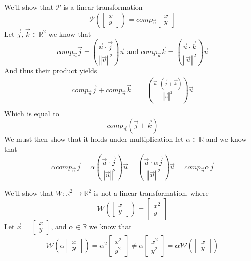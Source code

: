 \documentclass[notoc,notitlepage]{tufte-book}
\newcommand\mat[1]{\begin{bmatrix}#1\end{bmatrix}}
\begin{document}
\begin{eg}
    We'll show that $\mathcal{P}$ is a linear transformation 
    \begin{equation*}
        \mathcal{P}(\mat{ x \\ y }) = \mathit{comp}_{\vec{u}} {\mat{ x \\ y }} 
    \end{equation*}
    Let $\vec{j}, \vec{k} \in \mathbb{R}^2$ we know that 
    \begin{equation*}
        \mathit{comp}_{\vec{u}} {\vec{j}}  = \left( \frac{\vec{u} \cdot
        \vec{j}}{\left\Vert \vec{u} \right\Vert^2} \right) \vec{u} \text{ and }
        \mathit{comp}_{\vec{u}} {\vec{k}}  = \left( \frac{\vec{u} \cdot
        \vec{k}}{\left\Vert \vec{u} \right\Vert^2} \right) \vec{u}
    \end{equation*}
    And thus their product yields
    \begin{align*}
        \mathit{comp}_{\vec{u}} {\vec{j}}  + \mathit{comp}_{\vec{u}} {\vec{k}}
        &= \left( \frac{\vec{u} \cdot \left( \vec{j} + \vec{k}
        \right)}{\left\Vert \vec{u} \right\Vert^2} \right) \vec{u}\\
    \end{align*}
    Which is equal to 
    \begin{equation*}
        \mathit{comp}_{\vec{u}} {\left( \vec{j} + \vec{k} \right)}     
    \end{equation*}
    We must then show that it holds under multiplication let $\alpha \in
    \mathbb{R}$ and we know that 
    \begin{equation*}
        \alpha \mathit{comp}_{\vec{u}} {\vec{j}} = \alpha \left( \frac{\vec{u}
        \cdot \vec{j}}{ \left\Vert \vec{u} \right\Vert^2} \right) \vec{u} =
        \left( \frac{\vec{u} \cdot \alpha \vec{j}}{\left\Vert \vec{u}
        \right\Vert^2} \right) \vec{u} = \mathit{comp}_{\vec{u}} {\alpha \vec{j}} 
    \end{equation*}
\end{eg}

\begin{eg}
    We'll show that $W : \mathbb{R}^2 \to \mathbb{R}^2 $ is not a linear transformation, where
    \begin{equation*}
        \mathcal{W}\left(\mat{ x \\ y }\right) = \mat{ x^2 \\ y }
    \end{equation*}
    Let $\vec{x} = \mat{ x \\ y }$, and $\alpha  \in \mathbb{R}$  we know that
    \begin{equation*}
        \mathcal{W}\left(\alpha \mat{ x \\ y }\right) = \alpha^2 \mat{ x^2 \\ y^2 } \neq \alpha \mat{ x^2 \\ y^2 } = \alpha \mathcal{W}\left(\mat{ x \\ y }\right) 
    \end{equation*}
\end{eg}
\end{document}
